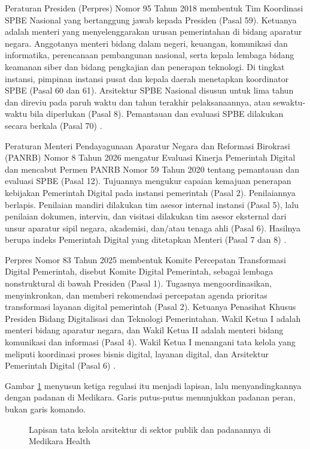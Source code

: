 Peraturan Presiden (Perpres) Nomor 95 Tahun 2018 membentuk Tim Koordinasi
SPBE Nasional yang bertanggung jawab kepada Presiden (Pasal 59). Ketuanya
adalah menteri yang menyelenggarakan urusan pemerintahan di bidang aparatur
negara. Anggotanya menteri bidang dalam negeri, keuangan, komunikasi dan
informatika, perencanaan pembangunan nasional, serta kepala lembaga bidang
keamanan siber dan bidang pengkajian dan penerapan teknologi. Di tingkat
instansi, pimpinan instansi pusat dan kepala daerah menetapkan koordinator
SPBE (Pasal 60 dan 61). Arsitektur SPBE Nasional disusun untuk lima tahun
dan direviu pada paruh waktu dan tahun terakhir pelaksanaannya, atau
sewaktu-waktu bila diperlukan (Pasal 8). Pemantauan dan evaluasi SPBE
dilakukan secara berkala (Pasal 70) \cite{perpres95-2018}.

Peraturan Menteri Pendayagunaan Aparatur Negara dan Reformasi Birokrasi
(PANRB) Nomor 8 Tahun 2026 mengatur Evaluasi Kinerja Pemerintah Digital dan
mencabut Permen PANRB Nomor 59 Tahun 2020 tentang pemantauan dan evaluasi
SPBE (Pasal 12). Tujuannya mengukur capaian kemajuan penerapan kebijakan
Pemerintah Digital pada instansi pemerintah (Pasal 2). Penilaiannya berlapis.
Penilaian mandiri dilakukan tim asesor internal instansi (Pasal 5), lalu
penilaian dokumen, interviu, dan visitasi dilakukan tim asesor eksternal
dari unsur aparatur sipil negara, akademisi, dan/atau tenaga ahli (Pasal 6).
Hasilnya berupa indeks Pemerintah Digital yang ditetapkan Menteri (Pasal 7
dan 8) \cite{permenpanrb8-2026}.

Perpres Nomor 83 Tahun 2025 membentuk Komite Percepatan Transformasi Digital
Pemerintah, disebut Komite Digital Pemerintah, sebagai lembaga
nonstruktural di bawah Presiden (Pasal 1). Tugasnya mengoordinasikan,
menyinkronkan, dan memberi rekomendasi percepatan agenda prioritas
transformasi layanan digital pemerintah (Pasal 2). Ketuanya Penasihat
Khusus Presiden Bidang Digitalisasi dan Teknologi Pemerintahan. Wakil Ketua
I adalah menteri bidang aparatur negara, dan Wakil Ketua II adalah menteri
bidang komunikasi dan informasi (Pasal 4). Wakil Ketua I menangani tata
kelola yang meliputi koordinasi proses bisnis digital, layanan digital, dan
Arsitektur Pemerintah Digital (Pasal 6) \cite{perpres83-2025}.

Gambar \ref{fig:ch14-tata-kelola-publik} menyusun ketiga regulasi itu
menjadi lapisan, lalu menyandingkannya dengan padanan di Medikara. Garis
putus-putus menunjukkan padanan peran, bukan garis komando.

\begin{figure}[!htb]
  \centering
  
  \caption{Lapisan tata kelola arsitektur di sektor publik dan padanannya di
           Medikara Health}
  \label{fig:ch14-tata-kelola-publik}
\end{figure}

